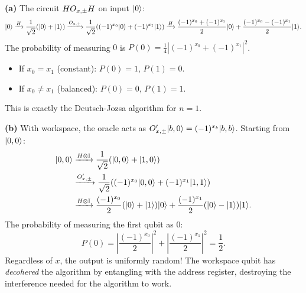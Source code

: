 \documentclass[12pt,oneside]{amsart}
\begin{document}
\begin{exercise}
\end{exercise}
\begin{solution}
  \textbf{(a)} The circuit $HO_{x,\pm} H$ on input $|0\rangle$:
  \[
    |0\rangle \xrightarrow{H} \frac{1}{\sqrt{2}}(|0\rangle+|1\rangle)
    \xrightarrow{O_{x,\pm}} \frac{1}{\sqrt{2}}((-1)^{x_0}|0\rangle+(-1)^{x_1}|1\rangle)
    \xrightarrow{H} \frac{(-1)^{x_0}+(-1)^{x_1}}{2}|0\rangle
    + \frac{(-1)^{x_0}-(-1)^{x_1}}{2}|1\rangle.
  \]
  The probability of measuring $0$ is
  $P(0) = \frac{1}{4}|(-1)^{x_0}+(-1)^{x_1}|^2$.
  \begin{itemize}
    \item If $x_0=x_1$ (constant): $P(0)=1$, $P(1)=0$.
    \item If $x_0\neq x_1$ (balanced): $P(0)=0$, $P(1)=1$.
  \end{itemize}
  This is exactly the Deutsch-Jozsa algorithm for $n=1$.

  \textbf{(b)} With workspace, the oracle acts as
  $O'_{x,\pm}|b,0\rangle = (-1)^{x_b}|b,b\rangle$.  Starting from
  $|0,0\rangle$:
  \begin{align}
    |0,0\rangle &\xrightarrow{H\otimes \mathbb{I}}
    \frac{1}{\sqrt{2}}(|0,0\rangle+|1,0\rangle) \\
    &\xrightarrow{O'_{x,\pm}}
    \frac{1}{\sqrt{2}}((-1)^{x_0}|0,0\rangle+(-1)^{x_1}|1,1\rangle) \\
    &\xrightarrow{H\otimes \mathbb{I}}
    \frac{(-1)^{x_0}}{2}(|0\rangle+|1\rangle)|0\rangle
    +\frac{(-1)^{x_1}}{2}(|0\rangle-|1\rangle)|1\rangle.
  \end{align}
  The probability of measuring the first qubit as $0$:
  \[
    P(0) = \left|\frac{(-1)^{x_0}}{2}\right|^2
    + \left|\frac{(-1)^{x_1}}{2}\right|^2 = \frac{1}{2}.
  \]
  Regardless of $x$, the output is uniformly random! The workspace qubit
  has \emph{decohered} the algorithm by entangling with the address
  register, destroying the interference needed for the algorithm to work.
\end{solution}
\end{document}
